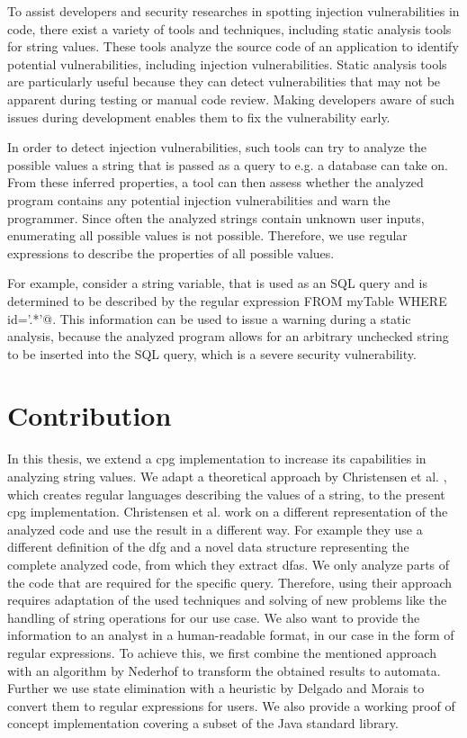 To assist developers and security researches in spotting injection vulnerabilities in code, there exist a variety of tools and techniques, including static analysis tools for string values. These tools analyze the source code of an application to identify potential vulnerabilities, including injection vulnerabilities. Static analysis tools are particularly useful because they can detect vulnerabilities that may not be apparent during testing or manual code review. Making developers aware of such issues during development enables them to fix the vulnerability early.

In order to detect injection vulnerabilities, such tools can try to analyze the possible values a string that is passed as a query to e.g. a database can take on.
From these inferred properties, a tool can then assess whether the analyzed program contains any potential injection vulnerabilities and warn the programmer.
Since often the analyzed strings contain unknown user inputs, enumerating all possible values is not possible. Therefore, we use regular expressions to describe the properties of all possible values.

For example, consider a string variable, that is used as an SQL query and is determined to be described by the regular expression \Verb@DELETE \* FROM myTable WHERE id='.*'@.
This information can be used to issue a warning during a static analysis, because the analyzed program allows for an arbitrary unchecked string to be inserted into the SQL query, which is a severe security vulnerability.

\section{Contribution}

In this thesis, we extend a \acf{cpg} implementation \cite{cpg} to increase its capabilities in analyzing string values. We adapt a theoretical approach by Christensen et al. \cite{brics}, which creates regular languages describing the values of a string, to the present \ac{cpg} implementation. Christensen et al. work on a different representation of the analyzed code and use the result in a different way. For example they use a different definition of the \ac{dfg} and a novel data structure representing the complete analyzed code, from which they extract \acp{dfa}. We only analyze parts of the code that are required for the specific query. Therefore, using their approach requires adaptation of the used techniques and solving of new problems like the handling of string operations for our use case. We also want to provide the information to an analyst in a human-readable format, in our case in the form of regular expressions.
To achieve this, we first combine the mentioned approach with an algorithm by Nederhof \cite{nederhof} to transform the obtained results to automata. Further we use state elimination with a heuristic by Delgado and Morais \cite{delgado} to convert them to regular expressions for users. We also provide a working proof of concept implementation covering a subset of the Java standard library.

